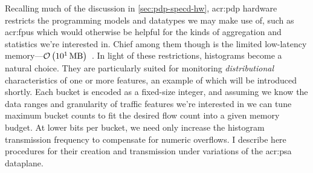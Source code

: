 






%

Recalling much of the discussion in \cref{sec:pdp-specd-hw}, \gls{acr:pdp} hardware restricts the programming models and datatypes we may make use of, such as \glspl{acr:fpu} which would otherwise be helpful for the kinds of aggregation and statistics we're interested in.
Chief among them though is the limited low-latency memory---$\mathcal{O}\left(\qty{e1}{\mega\byte}\right)$~\parencite{DBLP:conf/sosp/JinLZSLFKS17}.
In light of these restrictions, histograms become a natural choice.
They are particularly suited for monitoring \emph{distributional} characteristics of one or more features, an example of which will be introduced shortly.
Each bucket is encoded as a fixed-size integer, and assuming we know the data ranges and granularity of traffic features we're interested in we can tune maximum bucket counts to fit the desired flow count into a given memory budget.
At lower bits per bucket, we need only increase the histogram transmission frequency to compensate for numeric overflows.
I describe here procedures for their creation and transmission under variations of the \gls{acr:psa} dataplane.

